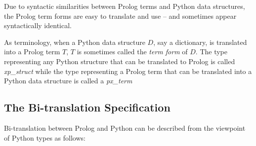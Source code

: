 Due to syntactic similarities between Prolog terms and Python data
structures, the Prolog term forms are easy to translate and use -- and
sometimes appear syntactically identical.

%
As terminology, when a Python data structure $D$, say a dictionary, is
translated into a Prolog term $T$, $T$ is sometimes called the {\em
  term form} of $D$.  The type representing any Python structure that
can be translated to Prolog is called {\em xp\_struct} while the type
representing a Prolog term that can be translated into a Python data
structure is called a {\em px\_term}

\subsection{The Bi-translation Specification}

Bi-translation between Prolog and Python can be described from the
viewpoint of Python types as follows:


